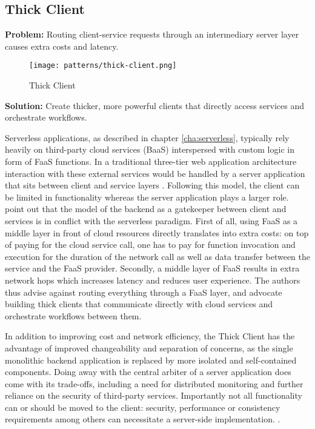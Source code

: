 \subsection{Thick Client} \label{subsec:thickClient}

\textbf{Problem:} Routing client-service requests through an intermediary server layer causes extra costs and latency.

\begin{figure}[h]
  \centering
  \texttt{[image: patterns/thick-client.png]}
  \caption{Thick Client}
  \label{fig:patternThickClient}
\end{figure}

\textbf{Solution:} Create thicker, more powerful clients that directly access services and orchestrate workflows.

Serverless applications, as described in chapter \ref{cha:serverless}, typically rely heavily on third-party cloud services (BaaS) interspersed with custom logic in form of FaaS functions. In a traditional three-tier web application architecture interaction with these external services would be handled by a server application that sits between client and service layers \parencite{robert2016serverlessarchitectures}. Following this model, the client can be limited in functionality whereas the server application plays a larger role. \textcite{sbarski2017serverless} point out that the model of the backend as a gatekeeper between client and services is in conflict with the serverless paradigm. First of all, using FaaS as a middle layer in front of cloud resources directly translates into extra costs: on top of paying for the cloud service call, one has to pay for function invocation and execution for the duration of the network call as well as data transfer between the service and the FaaS provider. Secondly, a middle layer of FaaS results in extra network hops which increases latency and reduces user experience. The authors thus advise against routing everything through a FaaS layer, and advocate building thick clients that communicate directly with cloud services and orchestrate workflows between them.

In addition to improving cost and network efficiency, the Thick Client has the advantage of improved changeability and separation of concerns, as the single monolithic backend application is replaced by more isolated and self-contained components. Doing away with the central arbiter of a server application does come with its trade-offs, including a need for distributed monitoring and further reliance on the security of third-party services. Importantly not all functionality can or should be moved to the client: security, performance or consistency requirements among others can necessitate a server-side implementation. \parencite{robert2016serverlessarchitectures}.


